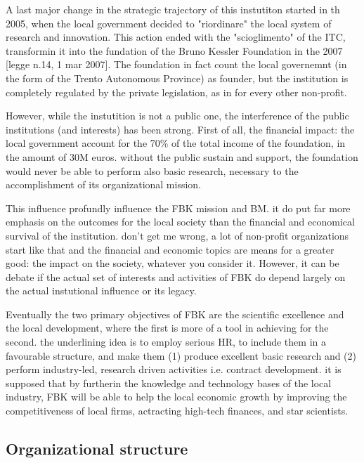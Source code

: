 A last major change in the strategic trajectory of this instutiton started in th 2005, when the local government decided to "riordinare" the local system of research and innovation. This action ended with the "scioglimento" of the ITC, transformin it into the fundation of the Bruno Kessler Foundation in the 2007 [legge n.14, 1 mar 2007]. The foundation in fact count the local governemnt (in the form of the Trento Autonomous Province) as founder, but the institution is completely regulated by the private legislation, as in for every other non-profit. 

However, while the instutition is not a public one, the interference of the public institutions (and interests) has been strong. First of all, the financial impact: the local government account for the 70\% of the total income of the foundation, in the amount of 30M euros. without the public sustain and support, the foundation would never be able to perform also basic research, necessary to the accomplishment of its organizational mission.

This influence profundly influence the FBK mission and BM. it do put far more emphasis on the outcomes for the local society than the financial and economical survival of the institution. don't get me wrong, a lot of non-profit organizations start like that and the financial and economic topics are means for a greater good: the impact on the society, whatever you consider it. However, it can be debate if the actual set of interests and activities of FBK do depend largely on the actual instutional influence or its legacy.

Eventually the two primary objectives of FBK are the scientific excellence and the local development, where the first is more of a tool in achieving for the second. the underlining idea is to employ serious HR, to include them in a favourable structure, and make them (1) produce excellent basic research and (2) perform industry-led, research driven activities i.e. contract development. it is supposed that by furtherin the knowledge and technology bases of the local industry, FBK will be able to help the local economic growth by improving the competitiveness of local firms, actracting high-tech finances, and star scientists.

\subsection{Organizational structure}



